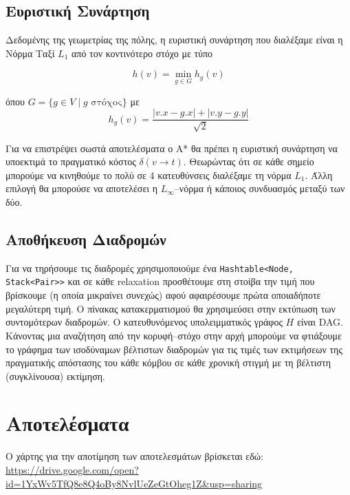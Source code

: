 \documentclass[a4paper,12pt]{article}
\begin{document}
\subsection{Ευριστική Συνάρτηση}

Δεδομένης της γεωμετρίας της πόλης, η ευριστική συνάρτηση που διαλέξαμε είναι η Νόρμα Ταξί $L_1$ από τον κοντινότερο στόχο με τύπο 

$$h(v) = \min_{g \in G} h_g(v)$$

όπου $G = \{ g \in V \mid g \text{ στόχος} \}$ με $$h_g(v) = \frac {|v.x - g.x | + |v.y - g.y |} {\sqrt 2}$$
 
Για να επιστρέψει σωστά αποτελέσματα ο Α* θα πρέπει η ευριστική συνάρτηση να υποεκτιμά το πραγματικό κόστος $\delta (v \to t)$. Θεωρώντας ότι σε κάθε σημείο μπορούμε να κινηθούμε το πολύ σε 4 κατευθύνσεις διαλέξαμε τη νόρμα $L_1$. Άλλη επιλογή θα μπορούσε να αποτελέσει η $L_\infty$--νόρμα ή κάποιος συνδυασμός μεταξύ των δύο.  

\subsection{Αποθήκευση Διαδρομών} 

Για να τηρήσουμε τις διαδρομές χρησιμοποιούμε ένα \texttt{Hashtable<Node, Stack<Pair>>} και σε κάθε relaxation προσθέτουμε στη στοίβα την τιμή που βρίσκουμε (η οποία μικραίνει συνεχώς) αφού αφαιρέσουμε πρώτα οποιαδήποτε μεγαλύτερη τιμή. Ο πίνακας κατακερματισμού θα χρησιμεύσει στην εκτύπωση των συντομότερων διαδρομών. Ο κατευθυνόμενος υπολειμματικός γράφος $H$ είναι DAG. Κάνοντας μια αναζήτηση από την κορυφή--στόχο στην αρχή μπορούμε να φτιάξουμε το γράφημα των ισοδύναμων βέλτιστων διαδρομών για τις τιμές των εκτιμήσεων της πραγματικής απόστασης του κάθε κόμβου σε κάθε χρονική στιγμή με τη βέλτιστη (συγκλίνουσα) εκτίμηση. 

\section{Αποτελέσματα}

Ο χάρτης για την αποτίμηση των αποτελεσμάτων βρίσκεται εδώ:
\url{https://drive.google.com/open?id=1YxWv5TfQ8e8Q4oBy8NvlUeZeGtOheg1Z&usp=sharing}
\end{document}
